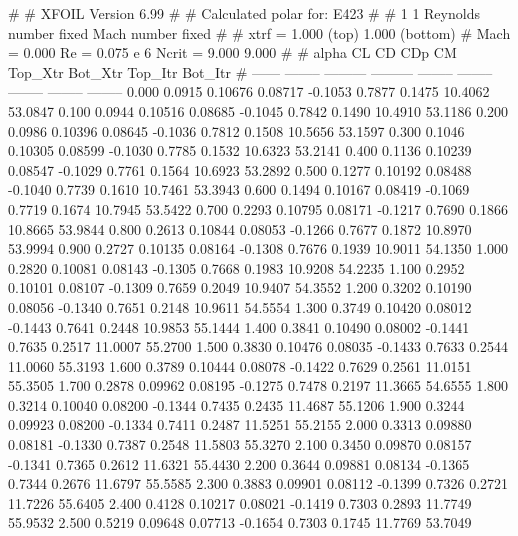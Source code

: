 #  
#       XFOIL         Version 6.99
#  
# Calculated polar for: E423                                            
#  
# 1 1 Reynolds number fixed          Mach number fixed         
#  
# xtrf =   1.000 (top)        1.000 (bottom)  
# Mach =   0.000     Re =     0.075 e 6     Ncrit =   9.000  9.000
#  
#   alpha    CL        CD       CDp       CM     Top_Xtr  Bot_Xtr  Top_Itr  Bot_Itr
#  ------ -------- --------- --------- -------- -------- -------- -------- --------
   0.000   0.0915   0.10676   0.08717  -0.1053   0.7877   0.1475  10.4062  53.0847
   0.100   0.0944   0.10516   0.08685  -0.1045   0.7842   0.1490  10.4910  53.1186
   0.200   0.0986   0.10396   0.08645  -0.1036   0.7812   0.1508  10.5656  53.1597
   0.300   0.1046   0.10305   0.08599  -0.1030   0.7785   0.1532  10.6323  53.2141
   0.400   0.1136   0.10239   0.08547  -0.1029   0.7761   0.1564  10.6923  53.2892
   0.500   0.1277   0.10192   0.08488  -0.1040   0.7739   0.1610  10.7461  53.3943
   0.600   0.1494   0.10167   0.08419  -0.1069   0.7719   0.1674  10.7945  53.5422
   0.700   0.2293   0.10795   0.08171  -0.1217   0.7690   0.1866  10.8665  53.9844
   0.800   0.2613   0.10844   0.08053  -0.1266   0.7677   0.1872  10.8970  53.9994
   0.900   0.2727   0.10135   0.08164  -0.1308   0.7676   0.1939  10.9011  54.1350
   1.000   0.2820   0.10081   0.08143  -0.1305   0.7668   0.1983  10.9208  54.2235
   1.100   0.2952   0.10101   0.08107  -0.1309   0.7659   0.2049  10.9407  54.3552
   1.200   0.3202   0.10190   0.08056  -0.1340   0.7651   0.2148  10.9611  54.5554
   1.300   0.3749   0.10420   0.08012  -0.1443   0.7641   0.2448  10.9853  55.1444
   1.400   0.3841   0.10490   0.08002  -0.1441   0.7635   0.2517  11.0007  55.2700
   1.500   0.3830   0.10476   0.08035  -0.1433   0.7633   0.2544  11.0060  55.3193
   1.600   0.3789   0.10444   0.08078  -0.1422   0.7629   0.2561  11.0151  55.3505
   1.700   0.2878   0.09962   0.08195  -0.1275   0.7478   0.2197  11.3665  54.6555
   1.800   0.3214   0.10040   0.08200  -0.1344   0.7435   0.2435  11.4687  55.1206
   1.900   0.3244   0.09923   0.08200  -0.1334   0.7411   0.2487  11.5251  55.2155
   2.000   0.3313   0.09880   0.08181  -0.1330   0.7387   0.2548  11.5803  55.3270
   2.100   0.3450   0.09870   0.08157  -0.1341   0.7365   0.2612  11.6321  55.4430
   2.200   0.3644   0.09881   0.08134  -0.1365   0.7344   0.2676  11.6797  55.5585
   2.300   0.3883   0.09901   0.08112  -0.1399   0.7326   0.2721  11.7226  55.6405
   2.400   0.4128   0.10217   0.08021  -0.1419   0.7303   0.2893  11.7749  55.9532
   2.500   0.5219   0.09648   0.07713  -0.1654   0.7303   0.1745  11.7769  53.7049
